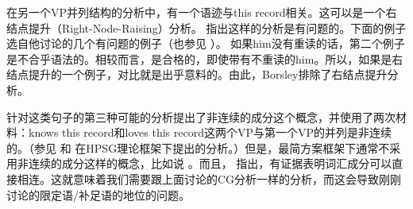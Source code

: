 在另一个VP并列结构的分析中，有一个语迹与this record相关。这可以是一个右结点提升（Right-Node-Raising）分析。 \citet{Borsley2005a}指出这样的分析是有问题的。下面的例子选自他讨论的几个有问题的例子（也参见 \citealp[]{Bresnan74a-u}）。
\eal
{}
\zl
如果him没有重读的话，第二个例子是不合乎语法的。相较而言，是合格的，即使带有不重读的him。所以，如果是右结点提升的一个例子，对比就是出乎意料的。由此，Borsley排除了右结点提升分析。

针对这类句子的第三种可能的分析提出了非连续的成分这个概念，并使用了两次材料：knows this record和loves this record这两个VP与第一个VP的并列是非连续的。（参见 和 在HPSG理论框架下提出的分析。）但是，最简方案框架下通常不采用非连续的成分这样的概念，比如说 。而且， \citet{Abeille2006a}指出，有证据表明词汇成分可以直接相连。这就意味着我们需要跟上面讨论的CG分析一样的分析，而这会导致刚刚讨论的限定语/补足语的地位的问题。

